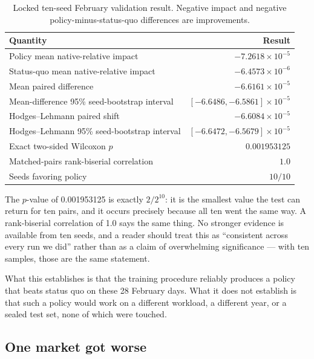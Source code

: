 ﻿\documentclass[12pt]{article}
\begin{document}
\begin{table}[htbp]
  \centering
  \small
  \caption{Locked ten-seed February validation result. Negative impact and
  negative policy-minus-status-quo differences are improvements.}
  \label{tab:ten-seed-result}
  \begin{tabular}{@{}lr@{}}
    \toprule
    Quantity & Result \\
    \midrule
    Policy mean native-relative impact & \(-7.2618\times10^{-5}\) \\
    Status-quo mean native-relative impact & \(-6.4573\times10^{-6}\) \\
    Mean paired difference & \(-6.6161\times10^{-5}\) \\
    Mean-difference 95\% seed-bootstrap interval
      & \([-6.6486,-6.5861]\times10^{-5}\) \\
    Hodges--Lehmann paired shift & \(-6.6084\times10^{-5}\) \\
    Hodges--Lehmann 95\% seed-bootstrap interval
      & \([-6.6472,-6.5679]\times10^{-5}\) \\
    Exact two-sided Wilcoxon \(p\) & \(0.001953125\) \\
    Matched-pairs rank-biserial correlation & \(1.0\) \\
    Seeds favoring policy & \(10/10\) \\
    \bottomrule
  \end{tabular}
\end{table}

The \(p\)-value of 0.001953125 is exactly \(2/2^{10}\): it is the smallest value
the test can return for ten pairs, and it occurs precisely because all ten went
the same way. A rank-biserial correlation of 1.0 says the same thing. No
stronger evidence is available from ten seeds, and a reader should treat this as
``consistent across every run we did'' rather than as a claim of overwhelming
significance --- with ten samples, those are the same statement.

What this establishes is that the training procedure reliably produces a policy
that beats status quo on these 28 February days. What it does not establish is
that such a policy would work on a different workload, a different year, or a
sealed test set, none of which were touched.

\subsection{One market got worse}
\label{subsec:campaign-markets}
\end{document}
